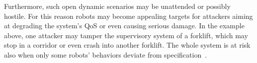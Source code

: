 \documentclass[journal, onecolumn, 12pt]{styles/IEEEtran}
\begin{document}
Furthermore, such open dynamic scenarios may be unattended or possibly hostile. For this reason robots may become appealing targets for attackers aiming at degrading the system's QoS or even causing serious damage. In the example above, one attacker may tamper the supervisory system of a forklift, which may stop in a corridor or even crash into another forklift. The whole system is at risk also when only some robots' behaviors deviate from specification~\cite{baras07}.
%
%
%
%
\end{document}
